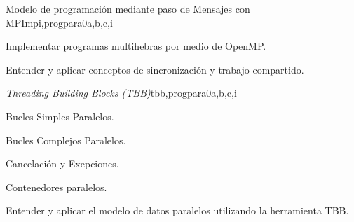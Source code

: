 \begin{syllabus}
\begin{unit}{Modelo de programación mediante paso de Mensajes con MPI}{}{mpi,progpara}{0}{a,b,c,i}
\begin{learningoutcomes}
	\item Implementar programas multihebras por medio de OpenMP.
	\item Entender y aplicar conceptos de sincronización y trabajo compartido.
\end{learningoutcomes}
\end{unit}

\begin{unit}{\textit{Threading Building Blocks (TBB)}}{}{tbb,progpara}{0}{a,b,c,i}
\begin{topics}
      \item Bucles Simples Paralelos.
      \item Bucles Complejos Paralelos.
      \item Cancelación y Exepciones.
      \item Contenedores paralelos. 
\end{topics}

\begin{learningoutcomes}
	\item Entender y aplicar el modelo de datos paralelos utilizando la herramienta TBB.
\end{learningoutcomes}
\end{unit}

\begin{coursebibliography}
\end{coursebibliography}

\end{syllabus}
